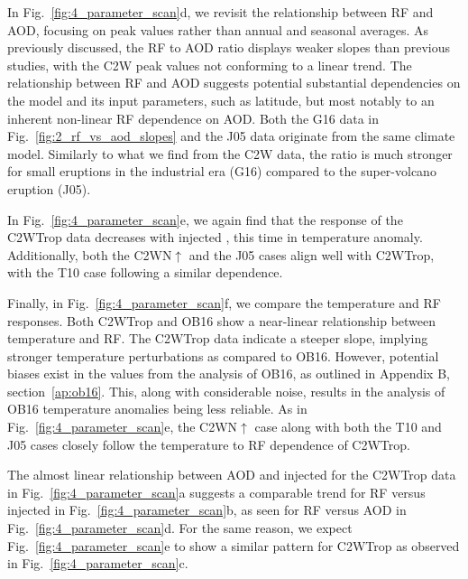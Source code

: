 \documentclass[draft]{agujournal2019}
\begin{document}
  In Fig.~\ref{fig:4_parameter_scan}d, we revisit the relationship between RF and AOD,
  focusing on peak values rather than annual and seasonal averages. As previously
  discussed, the RF to AOD ratio displays weaker slopes than previous studies, with the
  C2W peak values not conforming to a linear trend. The relationship between RF and AOD
  suggests potential substantial dependencies on the model and its input parameters,
  such as latitude, but most notably to an inherent non-linear RF dependence on AOD.
  Both the G16 data in Fig.~\ref{fig:2_rf_vs_aod_slopes} and the J05 data originate from
  the same climate model. Similarly to what we find from the C2W data, the ratio is much
  stronger for small eruptions in the industrial era (G16) compared to the super-volcano
  eruption (J05).

  In Fig.~\ref{fig:4_parameter_scan}e, we again find that the response of the C2WTrop
  data decreases with injected , this time in temperature anomaly. Additionally,
  both the C2WN\(\uparrow\) and the J05 cases align well with C2WTrop, with the T10 case
  following a similar dependence.

  Finally, in Fig.~\ref{fig:4_parameter_scan}f, we compare the temperature and RF
  responses. Both C2WTrop and OB16 show a near-linear relationship between temperature
  and RF. The C2WTrop data indicate a steeper slope, implying stronger temperature
  perturbations as compared to OB16. However, potential biases exist in the values from
  the analysis of OB16, as outlined in Appendix B, section~\ref{ap:ob16}. This, along
  with considerable noise, results in the analysis of OB16 temperature anomalies being
  less reliable. As in Fig.~\ref{fig:4_parameter_scan}e, the C2WN\(\uparrow\) case along
  with both the T10 and J05 cases closely follow the temperature to RF dependence of
  C2WTrop.

  The almost linear relationship between AOD and injected  for the C2WTrop data
  in Fig.~\ref{fig:4_parameter_scan}a suggests a comparable trend for RF versus injected
   in Fig.~\ref{fig:4_parameter_scan}b, as seen for RF versus AOD in
  Fig.~\ref{fig:4_parameter_scan}d. For the same reason, we expect
  Fig.~\ref{fig:4_parameter_scan}e to show a similar pattern for C2WTrop as observed in
  Fig.~\ref{fig:4_parameter_scan}c.
\end{document}
